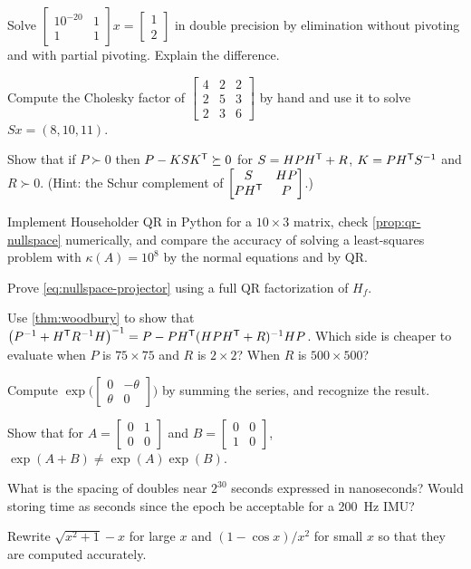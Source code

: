 \begin{exercises}
  \item Solve $\begin{bmatrix}10^{-20} & 1\\ 1 & 1\end{bmatrix}x = \begin{bmatrix}1\\2\end{bmatrix}$ in double precision by elimination without
        pivoting and with partial pivoting. Explain the difference.
  \item Compute the Cholesky factor of $\begin{bmatrix}4 & 2 & 2\\ 2 & 5 & 3\\ 2 & 3 & 6\end{bmatrix}$ by hand and use it to solve $Sx = (8, 10, 11)$.
  \item Show that if $P\succ0$ then $P - K S K^{\mathsf{T}} \succeq 0$ for $S = HPH^{\mathsf{T}} + R$, $K = PH^{\mathsf{T}} S^{-1}$ and $R \succ 0$. (Hint: the Schur complement of
        $\begin{bmatrix}S & HP\\ PH^{\mathsf{T}} & P\end{bmatrix}$.)
  \item Implement Householder QR in Python for a $10\times3$ matrix, check \cref{prop:qr-nullspace} numerically, and compare the accuracy of solving
        a least-squares problem with $\kappa(A) = 10^8$ by the normal equations and by QR.
  \item Prove \eqref{eq:nullspace-projector} using a full QR factorization of $H_f$.
  \item Use \cref{thm:woodbury} to show that $\big(P^{-1} + H^{\mathsf{T}} R^{-1} H\big)^{-1} = P - PH^{\mathsf{T}}(HPH^{\mathsf{T}} + R)^{-1} HP$. Which side is cheaper to evaluate when
        $P$ is $75\times75$ and $R$ is $2\times2$? When $R$ is $500\times500$?
  \item Compute $\exp\big(\begin{bmatrix}0 & -\theta\\ \theta & 0\end{bmatrix}\big)$ by summing the series, and recognize the result.
  \item Show that for $A = \begin{bmatrix}0 & 1\\0 & 0\end{bmatrix}$ and $B = \begin{bmatrix}0 & 0\\1 & 0\end{bmatrix}$,
        $\exp(A + B) \ne \exp(A)\exp(B)$.
  \item What is the spacing of doubles near $2^{30}$ seconds expressed in nanoseconds? Would storing time as  seconds since the epoch
        be acceptable for a 200~Hz IMU?
  \item Rewrite $\sqrt{x^2 + 1} - x$ for large $x$ and $(1 - \cos x)/x^2$ for small $x$ so that they are computed accurately.
\end{exercises}

